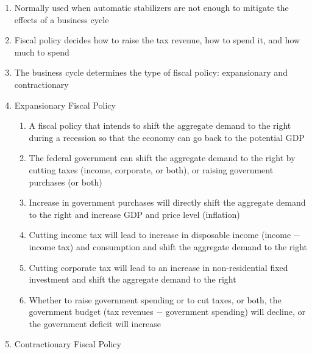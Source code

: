\documentclass[12pt]{article}
\begin{document}
\begin{enumerate}
\begin{enumerate}
          \item Normally used when automatic stabilizers are not enough to mitigate the effects of a business cycle

          \item Fiscal policy decides how to raise the tax revenue, how to spend it, and how much to spend

          \item The business cycle determines the type of fiscal policy: expansionary and contractionary

          \item Expansionary Fiscal Policy

            \begin{enumerate}

              \item A fiscal policy that intends to shift the aggregate demand to the right during a recession so that the economy can go back to the potential GDP

              \item The federal government can shift the aggregate demand to the right by cutting taxes (income, corporate, or both), or raising government purchases (or both)

              \item Increase in government purchases will directly shift the aggregate demand to the right and increase GDP and price level (inflation)

              \item Cutting income tax will lead to increase in disposable income (income $-$ income tax) and consumption and shift the aggregate demand to the right

              \item Cutting corporate tax will lead to an increase in non-residential fixed investment and shift the aggregate demand to the right

              \item Whether to raise government spending or to cut taxes, or both, the government budget (tax revenues $-$ government spending) will decline, or the government deficit will increase

            \end{enumerate}

          \item Contractionary Fiscal Policy

            \begin{enumerate}


\end{enumerate}
\end{enumerate}
\end{enumerate}
\end{document}
